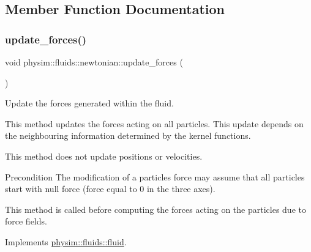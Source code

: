 \subsection{Member Function Documentation}
\mbox{\label{classphysim_1_1fluids_1_1newtonian_accfe7d69d2d3985e8ec8c8179a6cf5ba}} 
\subsubsection{\texorpdfstring{update\+\_\+forces()}{update\_forces()}\hspace{0.1cm}{\footnotesize\ttfamily [1/2]}}
{\footnotesize\ttfamily void physim\+::fluids\+::newtonian\+::update\+\_\+forces (\begin{DoxyParamCaption}{ }\end{DoxyParamCaption})\hspace{0.3cm}{\ttfamily [virtual]}}



Update the forces generated within the fluid. 

This method updates the forces acting on all particles. This update depends on the neighbouring information determined by the kernel functions.

This method does not update positions or velocities.

\begin{DoxyPrecond}{Precondition}
The modification of a particles\textquotesingle{} force may assume that all particles start with null force (force equal to 0 in the three axes). 

This method is called before computing the forces acting on the particles due to force fields. 
\end{DoxyPrecond}


Implements \hyperlink{classphysim_1_1fluids_1_1fluid_a6cde063d44b1e33199c08e64d801bb04}{physim\+::fluids\+::fluid}.

\mbox{\label{classphysim_1_1fluids_1_1newtonian_a2ad3a26c489e0167f16cc4cd2ead981d}} 
